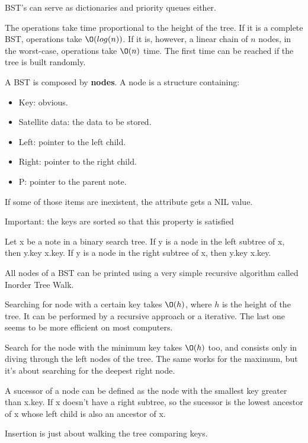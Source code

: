 BST's can serve as dictionaries and priority queues either.

The operations take time proportional to the height of the tree. If it is a complete BST, operations take $\O(log (n))$.  If it is, however, a linear chain of $n$ nodes, in the worst-case, operations take $\O(n)$ time. The first time can be reached if the tree is built randomly.

A BST is composed by \textbf{nodes}. A node is a structure containing:
\begin{itemize}
	\item Key: obvious.
	\item Satellite data: the data to be stored.
	\item Left: pointer to the left child.
	\item Right: pointer to the right child.
	\item P: pointer to the parent note.
\end{itemize}

If some of those items are inexistent, the attribute gets a NIL value.

Important: the keys are sorted so that this property is satisfied

Let x be a note in a binary search tree. If y is a node in the left subtree of x,
then y.key \le x.key. If y is a node in the right subtree of x, then
y.key \ge x.key.

All nodes of a BST can be printed using a very simple recursive algorithm called Inorder Tree Walk.

Searching for node with a certain key takes $\O(h)$, where $h$ is the height of the tree. It can be performed by a recursive approach or a iterative. The last one seems to be more
efficient on most computers.

Search for the node with the minimum key takes $\O(h)$ too, and consists only in diving through the left nodes of the tree. The same works for the maximum, but it's about searching for the deepest right node.

A sucessor of a node can be defined as the node with the smallest key greater than x.key. If x doesn't have a right subtree, so the sucessor is the lowest ancestor of x whose left child is also an ancestor of x.

Insertion is just about walking the tree comparing keys.

